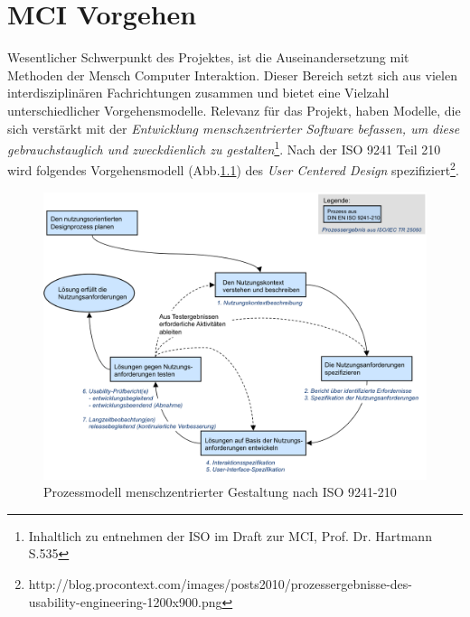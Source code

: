 
\chapter{MCI Vorgehen}
Wesentlicher Schwerpunkt des Projektes, ist die Auseinandersetzung mit Methoden der Mensch Computer Interaktion. Dieser Bereich  setzt sich aus vielen interdisziplinären Fachrichtungen zusammen und bietet eine Vielzahl unterschiedlicher Vorgehensmodelle. 
Relevanz für das Projekt, haben Modelle, die sich verstärkt mit der \textit{Entwicklung menschzentrierter Software befassen, um diese gebrauchstauglich und zweckdienlich zu gestalten}\footnote{Inhaltlich zu entnehmen der ISO im Draft zur MCI, Prof. Dr. Hartmann S.535}.
Nach der ISO 9241 Teil 210 wird folgendes Vorgehensmodell (Abb.\ref{prozessmodell}) des \textit{User Centered Design} spezifiziert\footnote{http://blog.procontext.com/images/posts2010/prozessergebnisse-des-usability-engineering-1200x900.png}. 

\begin{figure}[H]
\includegraphics[width=.9\textwidth]{./images/prozessergebnisse.png}
\caption{Prozessmodell menschzentrierter Gestaltung nach ISO 9241-210 }
\label{prozessmodell}
\end{figure}

